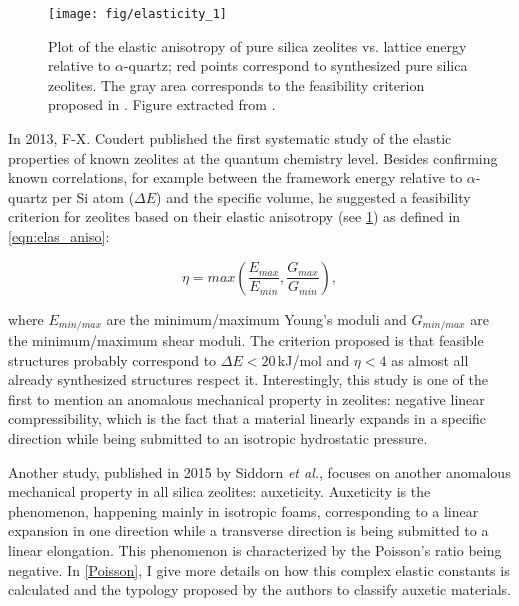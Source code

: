 \documentclass[journal=jacsat,manuscript=article]{achemso}
\begin{document}
\begin{figure}[ht!]\centering
\texttt{[image: fig/elasticity\_1]}
\caption{Plot of the elastic anisotropy of pure silica zeolites vs. lattice energy relative to $\alpha$-quartz; red points correspond to synthesized pure silica zeolites. The gray area corresponds to the feasibility criterion proposed in \cite{coudert_systematic_2013}. Figure extracted from \cite{coudert_systematic_2013}. 
\label{criterion_aniso}}
\end{figure}

In 2013, F-X. Coudert published the first systematic study of the elastic properties of known zeolites at the quantum chemistry level.\cite{coudert_systematic_2013} Besides confirming known correlations, for example between the framework energy relative to $\alpha$-quartz per Si atom ($\Delta E$) and the specific volume, he suggested a feasibility criterion for zeolites based on their elastic anisotropy (see \ref{criterion_aniso}) as defined in \ref{eqn:elas_aniso}:

\begin{equation}
\label{eqn:elas_aniso}
\eta = max\left(\frac{E_{max}}{E_{min}},\frac{G_{max}}{G_{min}}\right),
\end{equation}

\noindent where $E_{min/max}$ are the minimum/maximum Young's moduli and $G_{min/max}$ are the minimum/maximum shear moduli. The criterion proposed is that feasible structures probably correspond to $\Delta E < 20\,$kJ/mol and $\eta < 4$ as almost all already synthesized structures respect it. Interestingly, this study is one of the first to mention an anomalous mechanical property in zeolites: negative linear compressibility, which is the fact that a material linearly expands in a specific direction while being submitted to an isotropic hydrostatic pressure.\cite{cairns_negative_2015} 

Another study, published in 2015 by Siddorn \emph{et al.}, focuses on another anomalous mechanical property in all silica zeolites: auxeticity.\cite{siddorn_systematic_2015} Auxeticity is the phenomenon, happening mainly in isotropic foams, corresponding to a linear expansion in one direction while a transverse direction is being submitted to a linear elongation. This phenomenon is characterized by the Poisson's ratio being negative. In \ref{Poisson}, I give more details on how this complex elastic constants is calculated and the typology proposed by the authors to classify auxetic materials.
\end{document}
